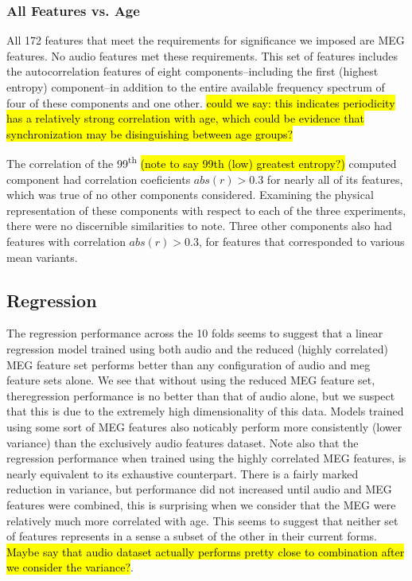 \documentclass[a4paper]{article}
\newcommand{\DK}[1]{{\small \textcolor{blue}{\hl{#1}}}}
\begin{document}
\subsubsection{All Features vs. Age}

All 172 features that meet the requirements for significance we imposed are MEG features. No audio features met these requirements. This set of features includes the autocorrelation features of eight components--including the first (highest entropy) component--in addition to the entire available frequency spectrum of four of these components and one other. \DK{could we say: this indicates periodicity has a relatively strong correlation with age, which could be evidence that synchronization may be disinguishing between age groups?}

The correlation of the 99\textsuperscript{th} \DK{(note to say 99th (low) greatest entropy?)} computed component had correlation coeficients $abs(r)>0.3$ for nearly all of its features, which was true of no other components considered. Examining the physical representation of these components with respect to each of the three experiments, there were no discernible similarities to note. Three other components also had features with correlation $abs(r)>0.3$, for features that corresponded to various mean variants.

\subsection{Regression}

The regression performance across the 10 folds seems to suggest that a linear regression model trained using both audio and the reduced (highly correlated) MEG feature set performs better than any configuration of audio and meg feature sets alone. We see that without using the reduced MEG feature set, theregression performance is no better than that of audio alone, but we suspect that this is due to the extremely high dimensionality of this data. Models trained using some sort of MEG features also noticably perform more consistently (lower variance) than the exclusively audio features dataset.
Note also that the regression performance when trained using the highly correlated MEG features, is nearly equivalent to its exhaustive counterpart. There is a fairly marked reduction in variance, but performance did not increased until audio and MEG features were combined, this is surprising when we consider that the MEG were relatively much more correlated with age. This seems to suggest that neither set of features represents in a sense a subset of the other in their current forms. \DK{Maybe say that audio dataset actually performs pretty close to combination after we consider the variance?}.
\end{document}
